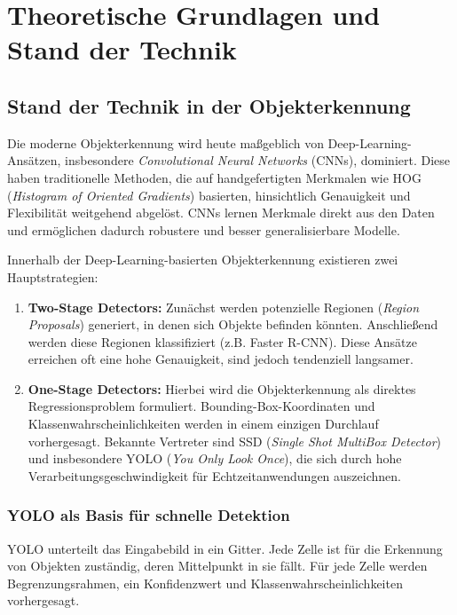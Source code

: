 \section{Theoretische Grundlagen und Stand der Technik}

\subsection{Stand der Technik in der Objekterkennung}

Die moderne Objekterkennung wird heute maßgeblich von Deep-Learning-Ansätzen, insbesondere \textit{Convolutional Neural Networks} (CNNs), dominiert. Diese haben traditionelle Methoden, die auf handgefertigten Merkmalen wie HOG (\textit{Histogram of Oriented Gradients}) basierten, hinsichtlich Genauigkeit und Flexibilität weitgehend abgelöst. CNNs lernen Merkmale direkt aus den Daten und ermöglichen dadurch robustere und besser generalisierbare Modelle.

Innerhalb der Deep-Learning-basierten Objekterkennung existieren zwei Hauptstrategien:

\begin{enumerate}
    \item \textbf{Two-Stage Detectors:} Zunächst werden potenzielle Regionen (\textit{Region Proposals}) generiert, in denen sich Objekte befinden könnten. Anschließend werden diese Regionen klassifiziert (z.B. Faster R-CNN). Diese Ansätze erreichen oft eine hohe Genauigkeit, sind jedoch tendenziell langsamer.
    \item \textbf{One-Stage Detectors:} Hierbei wird die Objekterkennung als direktes Regressionsproblem formuliert. Bounding-Box-Koordinaten und Klassenwahrscheinlichkeiten werden in einem einzigen Durchlauf vorhergesagt. Bekannte Vertreter sind SSD (\textit{Single Shot MultiBox Detector}) und insbesondere YOLO (\textit{You Only Look Once}), die sich durch hohe Verarbeitungsgeschwindigkeit für Echtzeitanwendungen auszeichnen.
\end{enumerate}

\subsubsection{YOLO als Basis für schnelle Detektion}

YOLO unterteilt das Eingabebild in ein Gitter. Jede Zelle ist für die Erkennung von Objekten zuständig, deren Mittelpunkt in sie fällt. Für jede Zelle werden Begrenzungsrahmen, ein Konfidenzwert und Klassenwahrscheinlichkeiten vorhergesagt. 

